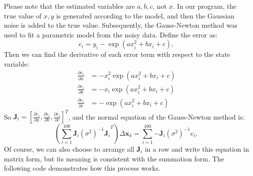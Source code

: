 Please note that the estimated variables are $a, b, c$, not $x$. In our program, the true value of $x,y$ is generated according to the model, and then the Gaussian noise is added to the true value. Subsequently, the Gauss-Newton method was used to fit a parametric model from the noisy data. Define the error as:
\begin{equation}
    e_i = y_i - \exp \left( {ax_i^2 + bx_i + c} \right),
\end{equation}
Then we can find the derivative of each error term with respect to the state variable:
\begin{equation}
    \begin{aligned}
        \frac{{\partial {e_i}}}{{\partial a}} &=  - x_i^2\exp \left( {ax_i^2 + b{x_i} + c} \right)\\
        \frac{{\partial e_i}}{{\partial b}} &=  - {x_i}\exp \left( {ax_i^2 + b{x_i} + c} \right)\\
        \frac{{\partial {e_i}}}{{\partial c}} &=  - \exp \left( {ax_i^2 + b{x_i} + c} \right)
    \end{aligned}
\end{equation}
So $\mathbf{J}_i = \left[\frac{{\partial {e_i}}}{{\partial a}},\frac{{\partial {e_i}}}{{\partial b}},\frac{{\partial {e_i}}}{{\partial c}} \right]^T$, and the normal equation of the Gauss-Newton method is:
\begin{equation}
    \left(\sum\limits_{i = 1}^{100} {\mathbf{J}_i{(\sigma^2)^{ - 1}}{\mathbf{J}_i}}^T \right) \Delta \mathbf{x}_k = \sum\limits_{i = 1}^{100} { - {\mathbf{J}_i}{(\sigma^2)^{ - 1}}{e_i}},
\end{equation}
Of course, we can also choose to arrange all $\mathbf{J}_i$ in a row and write this equation in matrix form, but its meaning is consistent with the summation form. The following code demonstrates how this process works.

